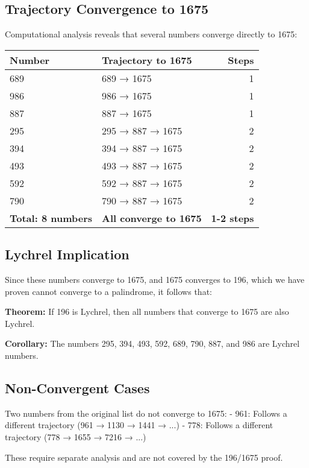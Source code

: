 \documentclass[12pt,a4paper]{article}
\begin{document}
\subsection{Trajectory Convergence to 1675}

Computational analysis reveals that several numbers converge directly to 1675:

\begin{tabular}{@{}l l r@{}}
\toprule
\textbf{Number} & \textbf{Trajectory to 1675} & \textbf{Steps} \\
\midrule
689 & 689 → 1675 & 1 \\
986 & 986 → 1675 & 1 \\
887 & 887 → 1675 & 1 \\
295 & 295 → 887 → 1675 & 2 \\
394 & 394 → 887 → 1675 & 2 \\
493 & 493 → 887 → 1675 & 2 \\
592 & 592 → 887 → 1675 & 2 \\
790 & 790 → 887 → 1675 & 2 \\
\midrule
\textbf{Total: 8 numbers} & \textbf{All converge to 1675} & \textbf{1-2 steps} \\
\bottomrule
\end{tabular}

\subsection{Lychrel Implication}

Since these numbers converge to 1675, and 1675 converges to 196, which we have proven cannot converge to a palindrome, it follows that:

\textbf{Theorem:} If 196 is Lychrel, then all numbers that converge to 1675 are also Lychrel.

\textbf{Corollary:} The numbers 295, 394, 493, 592, 689, 790, 887, and 986 are Lychrel numbers.

\subsection{Non-Convergent Cases}

Two numbers from the original list do not converge to 1675:
- 961: Follows a different trajectory (961 → 1130 → 1441 → ...)
- 778: Follows a different trajectory (778 → 1655 → 7216 → ...)

These require separate analysis and are not covered by the 196/1675 proof.
\end{document}
